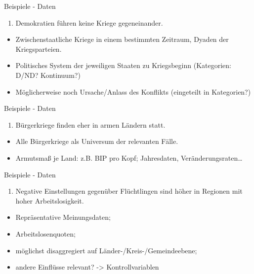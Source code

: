 \documentclass[ignorenonframetext,]{beamer}
\begin{document}
\begin{frame}{Beispiele - Daten}

\begin{enumerate}
\def\labelenumi{\arabic{enumi}.}
\itemsep1pt\parskip0pt
\item
  Demokratien führen keine Kriege gegeneinander.
\end{enumerate}

\begin{itemize}
\itemsep1pt\parskip0pt
\item
  Zwischenstaatliche Kriege in einem bestimmten Zeitraum, Dyaden der
  Kriegsparteien.
\item
  Politisches System der jeweiligen Staaten zu Kriegsbeginn (Kategorien:
  D/ND? Kontinuum?)
\item
  Möglicherweise noch Ursache/Anlass des Konflikts (eingeteilt in
  Kategorien?)
\end{itemize}

\end{frame}

\begin{frame}{Beispiele - Daten}

\begin{enumerate}
\def\labelenumi{\arabic{enumi}.}
\setcounter{enumi}{1}
\itemsep1pt\parskip0pt
\item
  Bürgerkriege finden eher in armen Ländern statt.
\end{enumerate}

\begin{itemize}
\itemsep1pt\parskip0pt
\item
  Alle Bürgerkriege als Universum der relevanten Fälle.
\item
  Armutsmaß je Land: z.B. BIP pro Kopf; Jahresdaten,
  Veränderungsraten\ldots{}
\end{itemize}

\end{frame}

\begin{frame}{Beispiele - Daten}

\begin{enumerate}
\def\labelenumi{\arabic{enumi}.}
\setcounter{enumi}{2}
\itemsep1pt\parskip0pt
\item
  Negative Einstellungen gegenüber Flüchtlingen sind höher in Regionen
  mit hoher Arbeitslosigkeit.
\end{enumerate}

\begin{itemize}
\itemsep1pt\parskip0pt
\item
  Repräsentative Meinungsdaten;
\item
  Arbeitslosenquoten;
\item
  möglichst disaggregiert auf Länder-/Kreis-/Gemeindeebene;
\item
  andere Einflüsse relevant? -\textgreater{} Kontrollvariablen
\end{itemize}

\end{frame}
\end{document}
